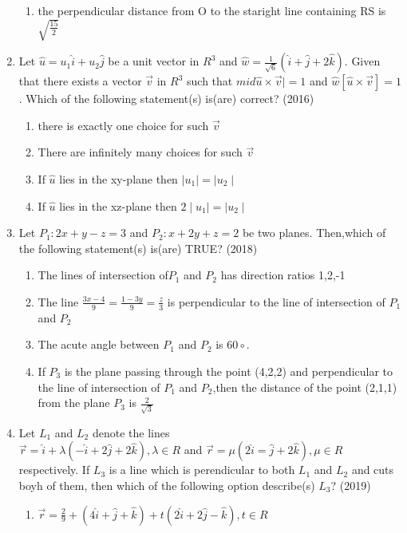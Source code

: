 \documentclass[12pt]{article}
\providecommand{\brak}[1]{\ensuremath{\left(#1\right)}}
\providecommand{\sbrak}[1]{\ensuremath{{}\left[#1\right]}}
\begin{document}
\begin{enumerate}
\begin{enumerate}
\item the perpendicular distance from O to the staright line containing RS is $\sqrt{\frac{15}{2}}$
\end{enumerate}
\item Let $\hat{u}=u_1\hat{i}+u_2\hat{j}$ be a unit vector in $R^3$ and $\hat{w}=\frac{1}{\sqrt{6}}\brak{\hat{i}+\hat{j}+2\hat{k}}$. Given that there exists a vector $\vec{v}$ in $R^3$ such that $mid \hat{u} \times \vec{v} \mid=1$ and $\hat{w}\sbrak{\hat{u}\times \vec{v}}=1$. Which of the following statement(s) is(are) correct? (2016)
\begin{enumerate}
\item there is exactly one choice for such $\vec{v}$
\item There are infinitely many choices for such $\vec{v}$
\item If $\hat{u}$ lies in the xy-plane then $\mid u_1 \mid = \mid u_2 \mid$
\item If $\hat{u}$ lies in the xz-plane then $2\mid u_1 \mid=\mid u_2 \mid$
\end{enumerate}
\item Let $P_1:2x+y-z=3$ and $P_2:x+2y+z=2$ be two planes. Then,which of the following statement(s) is(are) TRUE? (2018)
\begin{enumerate}
\item The lines of intersection of$P_1$ and $P_2$ has direction ratios 1,2,-1
\item The line $\frac{3x-4}{9}=\frac{1-3y}{9}=\frac{z}{3}$ is perpendicular to the line of intersection of $P_1$ and $P_2$
\item The acute angle between $P_1$ and $P_2$ is $60\circ$.
\item If $P_3$ is the plane passing through the point (4,2,2) and perpendicular to the line of intersection of $P_1$ and $P_2$,then the distance of the point (2,1,1) from the plane $P_3$ is $\frac{2}{\sqrt{3}}$
\end{enumerate}
\item Let $L_1$ and $L_2$ denote the lines\\$\vec{r}=\hat{i}+\lambda\brak{-\hat{i}+2\hat{j}+2\hat{k}},\lambda \in R$ and $\vec{r}=\mu \brak{2\hat{i}=\hat{j}+2\hat{k}},\mu \in R$\\ respectively. If $L_3$ is a line which is perendicular to both $L_1$ and $L_2$ and cuts boyh of them, then which of the following option describe(s) $L_3$? (2019)
\begin{enumerate}
\item $\vec{r}=\frac{2}{9}+\brak{4\hat{i}+\hat{j}+\hat{k}}+t\brak{2\hat{i}+2\hat{j}-\hat{k}},t \in R$

\end{enumerate}
\end{enumerate}
\end{document}
